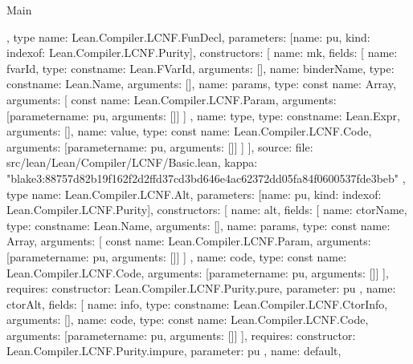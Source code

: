 \begin{lexlean}{Main}
\begin{toolingmodule}
{{{      }
    },
    type{
      name: Lean.Compiler.LCNF.FunDecl,
      parameters: [{name: pu, kind: index{of: Lean.Compiler.LCNF.Purity}}],
      constructors: [
        {
          name: mk,
          fields: [
            {name: fvarId, type: const{name: Lean.FVarId, arguments: []}},
            {name: binderName, type: const{name: Lean.Name, arguments: []}},
            {
              name: params,
              type: const{
                name: Array,
                arguments: [
                  const{
                    name: Lean.Compiler.LCNF.Param,
                    arguments: [parameter{name: pu, arguments: []}]
                  }
                ]
              }
            },
            {name: type, type: const{name: Lean.Expr, arguments: []}},
            {
              name: value,
              type: const{
                name: Lean.Compiler.LCNF.Code,
                arguments: [parameter{name: pu, arguments: []}]
              }
            }
          ]
        }
      ],
      source: {
        file: src/lean/Lean/Compiler/LCNF/Basic.lean,
        kappa: "blake3:88757d82b19f162f2d2ffd37cd3bd646e4ac62372dd05fa84f0600537fde3beb"
      }
    },
    type{
      name: Lean.Compiler.LCNF.Alt,
      parameters: [{name: pu, kind: index{of: Lean.Compiler.LCNF.Purity}}],
      constructors: [
        {
          name: alt,
          fields: [
            {name: ctorName, type: const{name: Lean.Name, arguments: []}},
            {
              name: params,
              type: const{
                name: Array,
                arguments: [
                  const{
                    name: Lean.Compiler.LCNF.Param,
                    arguments: [parameter{name: pu, arguments: []}]
                  }
                ]
              }
            },
            {
              name: code,
              type: const{
                name: Lean.Compiler.LCNF.Code,
                arguments: [parameter{name: pu, arguments: []}]
              }
            }
          ],
          requires: {constructor: Lean.Compiler.LCNF.Purity.pure, parameter: pu}
        },
        {
          name: ctorAlt,
          fields: [
            {name: info, type: const{name: Lean.Compiler.LCNF.CtorInfo, arguments: []}},
            {
              name: code,
              type: const{
                name: Lean.Compiler.LCNF.Code,
                arguments: [parameter{name: pu, arguments: []}]
              }
            }
          ],
          requires: {constructor: Lean.Compiler.LCNF.Purity.impure, parameter: pu}
        },
        {
          name: default,
}}}
\end{toolingmodule}
\end{lexlean}

